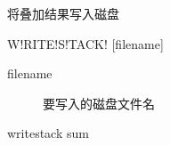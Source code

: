 \label{sss:writestack}

将叠加结果写入磁盘

\begin{SACSTX}
W!RITE!S!TACK! [filename]
\end{SACSTX}

\begin{description}
\item [filename] 要写入的磁盘文件名
\end{description}

\begin{SACDFT}
writestack sum
\end{SACDFT}
